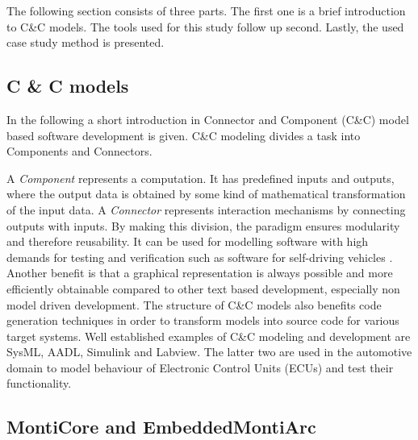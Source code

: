 The following section consists of three parts. The first one is a brief introduction to C\&C models. The tools used for this study follow up second. Lastly, the used case study method is presented.


\subsection{C \& C models}

In the following a short introduction in Connector and Component (C\&C) model based software development is given. C\&C modeling divides a task into Components and Connectors.

A \emph{Component} represents a computation. It has predefined inputs and outputs, where the output data is obtained by some kind of mathematical transformation of the input data. A \emph{Connector} represents interaction mechanisms by connecting outputs with inputs. By making this division, the paradigm ensures modularity and therefore reusability.
It can be used for modelling software with high demands for testing and verification such as software for self-driving vehicles \cite{WencksternCCViP}\cite{WencksternSimFrame}.
Another benefit is that a graphical representation is always possible and more efficiently obtainable compared to other text based development, especially non model driven development. The structure of C\&C models also benefits code generation techniques in order to transform models into source code for various target systems.
Well established examples of C\&C modeling and development are SysML\cite{sysml}, AADL\cite{aadl}, Simulink\cite{simulink} and Labview\cite{labview}. The latter two are used in the automotive domain to model behaviour of Electronic Control Units (ECUs) and test their functionality.

\subsection{MontiCore and EmbeddedMontiArc}

